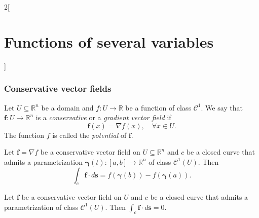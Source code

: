 \documentclass[class=article,10pt,crop=false]{standalone}
\begin{document}
\begin{multicols}{2}[\section{Functions of several variables}]
\subsubsection*{Conservative vector fields}
\begin{definition}
Let $U\subseteq\mathbb{R}^n$ be a domain and $f:U\rightarrow\mathbb{R}$ be a function of class $\mathcal{C}^1$. We say that $\boldsymbol{f}:U\rightarrow\mathbb{R}^n$ is a \textit{conservative} or a \textit{gradient vector field} if $$\boldsymbol{f}(x)=\nabla f(x),\quad \forall x\in U.$$ The function $f$ is called the \textit{potential} of $\boldsymbol{f}$.
\end{definition}
\begin{theorem}
Let $\boldsymbol{f}=\nabla f$ be a conservative vector field on $U\subseteq\mathbb{R}^n$ and $c$ be a closed curve that admits a parametrization $\boldsymbol{\gamma}(t):[a,b]\rightarrow\mathbb{R}^n$ of class $\mathcal{C}^1(U)$. Then $$\int_c\boldsymbol{f}\cdot d\textbf{s}=f(\boldsymbol{\gamma}(b))-f(\boldsymbol{\gamma}(a)).$$
\end{theorem}
\begin{corollary}
Let $\boldsymbol{f}$ be a conservative vector field on $U$ and $c$ be a closed curve that admits a parametrization of class $\mathcal{C}^1(U)$. Then $\displaystyle\int_c\boldsymbol{f}\cdot d\textbf{s}=0$.
\end{corollary}

\end{multicols}
\end{document}
